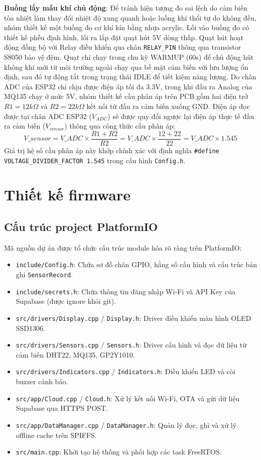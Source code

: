 \textbf{Buồng lấy mẫu khí chủ động}: Để tránh hiện tượng đo sai lệch do cảm biến tỏa nhiệt làm thay đổi nhiệt độ xung quanh hoặc luồng khí thổi tự do không đều, nhóm thiết kế một buồng đo cơ khí kín bằng nhựa acrylic. Lối vào buồng đo có thiết kế phễu định hình, lối ra lắp đặt quạt hút 5V dòng thấp. Quạt hút hoạt động đồng bộ với Relay điều khiển qua chân \texttt{RELAY\_PIN} thông qua transistor S8050 bảo vệ đệm. Quạt chỉ chạy trong chu kỳ WARMUP (60s) để chủ động hút không khí mới từ môi trường ngoài chạy qua bề mặt cảm biến với lưu lượng ổn định, sau đó tự động tắt trong trạng thái IDLE để tiết kiệm năng lượng.
  Do chân ADC của ESP32 chỉ chịu được điện áp tối đa 3.3V, trong khi đầu ra Analog của MQ135 chạy ở mức 5V, nhóm thiết kế cầu phân áp trên PCB gồm hai điện trở $R1 = 12k\Omega$ và $R2 = 22k\Omega$ kết nối từ đầu ra cảm biến xuống GND. Điện áp đọc được tại chân ADC ESP32 ($V_{ADC}$) sẽ được quy đổi ngược lại điện áp thực tế đầu ra cảm biến ($V_{sensor}$) thông qua công thức cầu phân áp:
  \begin{equation}
      V\_{sensor} = V\_{ADC} \times \frac{R1 + R2}{R2} = V\_{ADC} \times \frac{12 + 22}{22} = V\_{ADC} \times 1.545
  \end{equation}
  Giá trị hệ số cầu phân áp này khớp chính xác với định nghĩa \texttt{\#define VOLTAGE\_DIVIDER\_FACTOR 1.545} trong cấu hình \texttt{Config.h}.

\section{Thiết kế firmware}
\subsection{Cấu trúc project PlatformIO}
Mã nguồn dự án được tổ chức cấu trúc module hóa rõ ràng trên PlatformIO:
\begin{itemize}
    \item \texttt{include/Config.h}: Chứa sơ đồ chân GPIO, hằng số cấu hình và cấu trúc bản ghi \texttt{SensorRecord}.
    \item \texttt{include/secrets.h}: Chứa thông tin đăng nhập Wi-Fi và API Key của Supabase (được ignore khỏi git).
    \item \texttt{src/drivers/Display.cpp} / \texttt{Display.h}: Driver điều khiển màn hình OLED SSD1306.
    \item \texttt{src/drivers/Sensors.cpp} / \texttt{Sensors.h}: Driver cấu hình và đọc dữ liệu từ cảm biến DHT22, MQ135, GP2Y1010.
    \item \texttt{src/drivers/Indicators.cpp} / \texttt{Indicators.h}: Điều khiển LED và còi buzzer cảnh báo.
    \item \texttt{src/app/Cloud.cpp} / \texttt{Cloud.h}: Xử lý kết nối Wi-Fi, OTA và gửi dữ liệu Supabase qua HTTPS POST.
    \item \texttt{src/app/DataManager.cpp} / \texttt{DataManager.h}: Quản lý đọc, ghi và xử lý offline cache trên SPIFFS.
    \item \texttt{src/main.cpp}: Khởi tạo hệ thống và phối hợp các task FreeRTOS.
\end{itemize}

